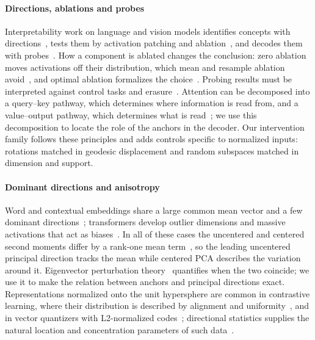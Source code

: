 \documentclass[10pt,letterpaper]{article}
\begin{document}
\paragraph*{Directions, ablations and probes}
Interpretability work on language and vision models identifies concepts with
directions~\cite{park2024linear,marks2024geometry}, tests them by activation patching and
ablation~\cite{vig2020causal,rome2022,wang2023ioi,conmy2023acdc,geiger2024abstraction,
arditi2024refusal}, and decodes them with probes~\cite{alain2017probes,
hewitt2019probes,belinkov2022probing}. How a component is ablated changes the
conclusion: zero ablation moves activations off their distribution, which mean and
resample ablation avoid~\cite{chan2022causalscrubbing,heimersheim2024patching,
zhang2024bestpractices}, and optimal ablation formalizes the choice~\cite{li2024optimalablation}. Probing results must be interpreted against control
tasks and erasure~\cite{hewitt2019probes,elazar2021amnesic,ravfogel2020inlp,
belrose2023leace}. Attention can be decomposed into a query--key pathway, which determines
where information is read from, and a value--output pathway, which determines what is read~\cite{elhage2021framework}; we use this decomposition to locate the role of the anchors in
the decoder. Our intervention family follows these principles and adds controls specific
to normalized inputs: rotations matched in geodesic displacement and random subspaces
matched in dimension and support.

\paragraph*{Dominant directions and anisotropy}
Word and contextual embeddings share a large common mean vector and a few dominant
directions~\cite{mu2018allbutthetop,ethayarajh2019contextual,gao2019degeneration,
bis2021toomuch}; transformers develop outlier dimensions and massive activations that
act as biases~\cite{kovaleva2021busters,timkey2021rogue,dettmers2022int8,
sun2024massive,darcet2024registers}. In all of these cases the uncentered and centered
second moments differ by a rank-one mean term~\cite{honeine2014centering}, so the
leading uncentered principal direction tracks the mean while centered PCA describes the
variation around it. Eigenvector perturbation theory~\cite{davis1970rotation,
yu2015daviskahan} quantifies when the two coincide; we use it to make the relation
between anchors and principal directions exact. Representations normalized onto the unit
hypersphere are common in contrastive learning, where their distribution is described by
alignment and uniformity~\cite{wang2020hypersphere}, and in vector quantizers with
L2-normalized codes~\cite{yu2022vitvqgan}; directional statistics supplies the natural
location and concentration parameters of such data~\cite{mardia2000directional}.
\end{document}
